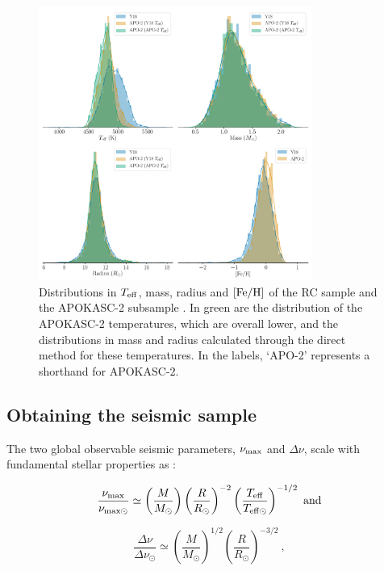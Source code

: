 \documentclass[fleqn,usenatbib]{mnras}
\newcommand{\numax}{\mbox{$\nu_{\rm max}$}\xspace}
\newcommand{\dnu}{\mbox{$\Delta \nu$}\xspace}
\newcommand{\teff}{\mbox{$T_{\rm eff}$}\xspace}
\newcommand{\feh}{\mbox{$\rm{[Fe/H]}$}\xspace}
\begin{document}
\begin{figure}
\centering
\includegraphics[width=0.8\textwidth]{apokasc-2-dists.pdf}
\caption{Distributions in \teff, mass, radius and \feh of the RC sample \protect\citep{art:yu+2018} and the APOKASC-2 subsample \protect\citep{art:pinsonneault+2014,art:pinsonneault+2018}. In green are the distribution of the APOKASC-2 temperatures, which are overall lower, and the distributions in mass and radius calculated through the direct method for these temperatures. In the labels, `APO-2' represents a shorthand for APOKASC-2.}
\label{fig:apo2}
\end{figure}



\subsection{Obtaining the seismic sample}
The two global observable seismic parameters, \numax and \dnu, scale with fundamental stellar properties as \citep{art:brown+1991, art:kjeldsen+bedding1995}:

\begin{equation}
\frac{\nu_{\rm max}}{\nu_{\rm{max\odot}}} \simeq \left(\frac{M}{M_\odot}\right)\left(\frac{R}{R_\odot}\right)^{-2}\left(\frac{T_{\rm{eff}}}{T_{\rm{eff\odot}}}\right)^{-1/2}\ \rm{and}
\end{equation}

\begin{equation}
\frac{\Delta\nu}{\Delta\nu_\odot} \simeq \left(\frac{M}{M_\odot}\right)^{1/2}\left(\frac{R}{R_\odot}\right)^{-3/2}\ ,
\end{equation}
\end{document}
